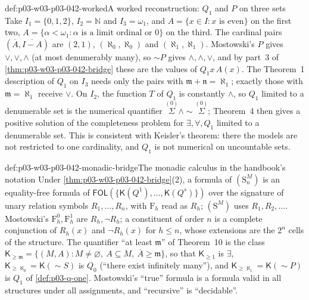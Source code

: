 \begin{hbexample}{def:p03-w03-p03-042-worked}{A worked reconstruction: \(Q_1\) and \(P\) on three sets}
Take \(I_1=\{0,1,2\}\), \(I_2=\mathbb N\) and \(I_3=\omega_1\), and
\(A=\{x\in I:x\text{ is even}\}\) on the first two, \(A=\{\alpha<\omega_1:
\alpha\text{ is a limit ordinal or }0\}\) on the third.  The cardinal pairs
\((\overline A,\overline{I-A})\) are \((2,1)\), \((\aleph_0,\aleph_0)\) and
\((\aleph_1,\aleph_1)\).  Mostowski's \(P\) gives \(\vee,\vee,\wedge\)
(at most denumerably many), so \({\sim}P\) gives \(\wedge,\wedge,\vee\),
and by part~3 of \cref{thm:p03-w03-p03-042-bridge} these are the values
of \(Q_1x\,A(x)\).  The Theorem~1 description of \(Q_1\) on \(I_3\) needs
only the pairs with \(\mathfrak m+\mathfrak n=\aleph_1\); exactly those
with \(\mathfrak m=\aleph_1\) receive \(\vee\).  On \(I_2\), the function
\(T\) of \(Q_1\) is constantly \(\wedge\), so \(Q_1\) limited to a
denumerable set is the numerical quantifier \(\overset{(0)}{\Sigma}\wedge
{\sim}\overset{(0)}{\Sigma}\); Theorem~4 then gives a positive solution of
the completeness problem for \(\exists,\forall,Q_1\) limited to a
denumerable set.  This is consistent with Keisler's theorem: there the
models are not restricted to one cardinality, and \(Q_1\) is not numerical
on uncountable sets.
\end{hbexample}

\begin{hbconvention}{def:p03-w03-p03-042-monadic-bridge}{The monadic calculus in the handbook's notation}
Under \cref{thm:p03-w03-p03-042-bridge}(2), a formula of \((\mathrm
S^M_n)\) is an equality-free formula of
\(\mathsf{FOL}(\{\mathsf K(Q^1),\ldots,\mathsf K(Q^s)\})\) over the
signature of unary relation symbols \(R_1,\ldots,R_n\), with \(\mathrm
F_h\) read as \(R_h\); \((\mathrm S^M)\) uses \(R_1,R_2,\ldots\).
Mostowski's \(\mathrm F_h^0,\mathrm F_h^1\) are \(R_h,\neg R_h\); a
constituent of order \(n\) is a complete conjunction of \(R_h(x)\) and
\(\neg R_h(x)\) for \(h\leq n\), whose extensions are the \(2^n\) cells of
the structure.  The quantifier ``at least \(\mathfrak m\)'' of
Theorem~10 is the class \(\mathsf K_{\geq\mathfrak m}=\{(M,A):
M\neq\varnothing,\ A\subseteq M,\ \overline A\geq\mathfrak m\}\), so that
\(\mathsf K_{\geq1}\) is \(\exists\), \(\mathsf K_{\geq\aleph_0}=\mathsf
K({\sim}S)\) is \(Q_0\) (``there exist infinitely many''), and
\(\mathsf K_{\geq\aleph_1}=\mathsf K({\sim}P)\) is \(Q_1\) of
\cref{def:p03-q-one}.  Mostowski's ``true'' formula is a formula valid in
all structures under all assignments, and ``recursive'' is
``decidable''.
\end{hbconvention}


